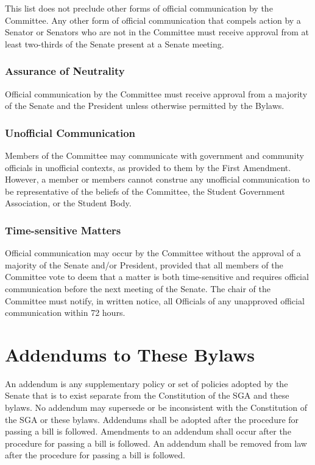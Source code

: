 \documentclass[12pt]{scrreprt}
\begin{document}
This list does not preclude other forms of official communication by the Committee. Any
other form of official communication that compels action by a Senator or Senators who
are not in the Committee must receive approval from at least two-thirds of the Senate
present at a Senate meeting.

\subsection{Assurance of Neutrality}
Official communication by the Committee must receive approval from a majority of the
Senate and the President unless otherwise permitted by the Bylaws.

\subsection{Unofficial Communication}
Members of the Committee may communicate with government and community officials
in unofficial contexts, as provided to them by the First Amendment. However, a member
or members cannot construe any unofficial communication to be representative of the
beliefs of the Committee, the Student Government Association, or the Student Body.

\subsection{Time-sensitive Matters}
Official communication may occur by the Committee without the approval of a majority
of the Senate and/or President, provided that all members of the Committee vote to
deem that a matter is both time-sensitive and requires official communication before the
next meeting of the Senate. The chair of the Committee must notify, in written notice, all
Officials of any unapproved official communication within 72 hours.


\chapter{Addendums to These Bylaws} \label{sec:addendums}
An addendum is any supplementary policy or set of policies adopted by the Senate that is to exist separate from the Constitution of the SGA and these bylaws. No addendum may supersede or be inconsistent with the Constitution of the SGA or these bylaws. 
Addendums shall be adopted after the procedure for passing a bill is followed. 
Amendments to an addendum shall occur after the procedure for passing a bill is followed. An addendum shall be removed from law after the procedure for passing a bill is followed.
\end{document}
